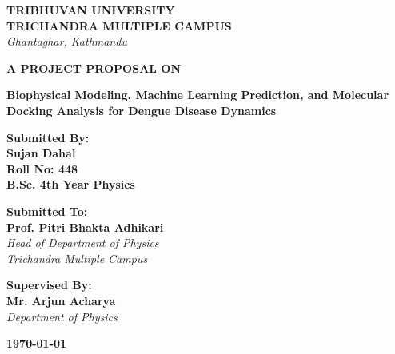 \documentclass[12pt, a4paper]{article}
\begin{document}
\begin{titlepage}
    \begin{center}
        \vspace*{0.5cm}
        
        \textbf{\large TRIBHUVAN UNIVERSITY}\\
        \textbf{\large TRICHANDRA MULTIPLE CAMPUS}\\
        \textit{Ghantaghar, Kathmandu}
        
        \vspace{3cm}
        
        \textbf{\Large A PROJECT PROPOSAL ON}
        
        \vspace{1cm}
        
        \textbf{\Huge Biophysical Modeling, Machine Learning Prediction, and Molecular Docking Analysis for Dengue Disease Dynamics}
            
        \vspace{3cm}
        
        \textbf{Submitted By:}\\
        \textbf{Sujan Dahal}\\
        \textbf{Roll No: 448}\\
        \textbf{B.Sc. 4th Year Physics}
        
        \vspace{2cm}
        
        \textbf{Submitted To:}\\
        \textbf{Prof. Pitri Bhakta Adhikari}\\
        \textit{Head of Department of Physics}\\
        \textit{Trichandra Multiple Campus}
        
        \vspace{1cm}
        
        \textbf{Supervised By:}\\
        \textbf{Mr. Arjun Acharya}\\
        \textit{Department of Physics}
        
        \vspace{2cm}
        \textbf{\today}
        
    \end{center}
\end{titlepage}
\end{document}
